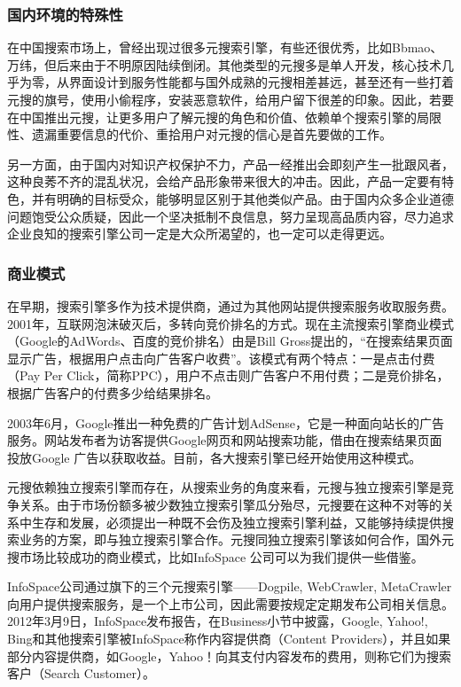 \subsubsection{国内环境的特殊性}
在中国搜索市场上，曾经出现过很多元搜索引擎，有些还很优秀，比如Bbmao、万纬，但后来由于不明原因陆续倒闭。其他类型的元搜多是单人开发，核心技术几乎为零，从界面设计到服务性能都与国外成熟的元搜相差甚远，甚至还有一些打着元搜的旗号，使用小偷程序，安装恶意软件，给用户留下很差的印象。因此，若要在中国推出元搜，让更多用户了解元搜的角色和价值、依赖单个搜索引擎的局限性、遗漏重要信息的代价、重拾用户对元搜的信心是首先要做的工作。

另一方面，由于国内对知识产权保护不力，产品一经推出会即刻产生一批跟风者，这种良莠不齐的混乱状况，会给产品形象带来很大的冲击。因此，产品一定要有特色，并有明确的目标受众，能够明显区别于其他类似产品。由于国内众多企业道德问题饱受公众质疑，因此一个坚决抵制不良信息，努力呈现高品质内容，尽力追求企业良知的搜索引擎公司一定是大众所渴望的，也一定可以走得更远。

\subsubsection{商业模式}
在早期，搜索引擎多作为技术提供商，通过为其他网站提供搜索服务收取服务费。2001年，互联网泡沫破灭后，多转向竞价排名的方式。现在主流搜索引擎商业模式（Google的AdWords、百度的竞价排名）由是Bill Gross提出的，“在搜索结果页面显示广告，根据用户点击向广告客户收费”。该模式有两个特点：一是点击付费（Pay Per Click，简称PPC），用户不点击则广告客户不用付费；二是竞价排名，根据广告客户的付费多少给结果排名。

2003年6月，Google推出一种免费的广告计划AdSense，它是一种面向站长的广告服务。网站发布者为访客提供Google网页和网站搜索功能，借由在搜索结果页面投放Google 广告以获取收益。目前，各大搜索引擎已经开始使用这种模式。

元搜依赖独立搜索引擎而存在，从搜索业务的角度来看，元搜与独立搜索引擎是竞争关系。由于市场份额多被少数独立搜索引擎瓜分殆尽，元搜要在这种不对等的关系中生存和发展，必须提出一种既不会伤及独立搜索引擎利益，又能够持续提供搜索业务的方案，即与独立搜索引擎合作。元搜同独立搜索引擎该如何合作，国外元搜市场比较成功的商业模式，比如InfoSpace 公司可以为我们提供一些借鉴。

InfoSpace公司通过旗下的三个元搜索引擎——Dogpile, WebCrawler, MetaCrawler向用户提供搜索服务，是一个上市公司，因此需要按规定定期发布公司相关信息。
2012年3月9日，InfoSpace发布报告，在Business小节中披露，Google, Yahoo!, Bing和其他搜索引擎被InfoSpace称作内容提供商（Content Providers），并且如果部分内容提供商，如Google，Yahoo！向其支付内容发布的费用，则称它们为搜索客户（Search Customer）。

